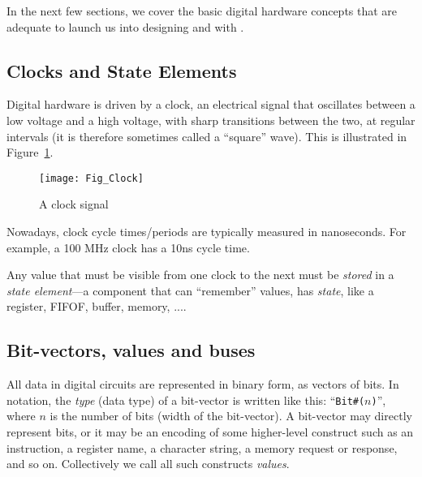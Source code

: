 In the next few sections, we cover the basic digital hardware concepts
that are adequate to launch us into designing {\DRUM} and {\FIFE} with {\BSV}.


\subsection{Clocks and State Elements}

Digital hardware is driven by a clock, an electrical signal that
oscillates between a low voltage and a high voltage, with sharp
transitions between the two, at regular intervals (it is therefore
sometimes called a ``square'' wave).  This is illustrated in
Figure~\ref{Fig_Clock_1}.

\begin{figure}[htbp]
  \centerline{\texttt{[image: Fig\_Clock]}}
  \caption{\label{Fig_Clock_1}A clock signal}
\end{figure}

Nowadays, clock cycle times/periods are typically measured in
nanoseconds. For example, a 100 MHz clock has a 10ns cycle time.


Any value that must be visible from one clock to the next must be
\emph{stored} in a \emph{state element}---a component that can
``remember'' values, {\ie} has \emph{state}, like a register, FIFOF,
buffer, memory, ....


\subsection{Bit-vectors, values and buses}


All data in digital circuits are represented in binary form, as
vectors of bits.  In {\BSV} notation, the \emph{type} (data type) of a
bit-vector is written like this: ``{\tt Bit\#($n$)}'', where $n$ is
the number of bits (width of the bit-vector).  A bit-vector may
directly represent bits, or it may be an encoding of some higher-level
construct such as an instruction, a register name, a character string,
a memory request or response, and so on.  Collectively we call all
such constructs \emph{values}.

